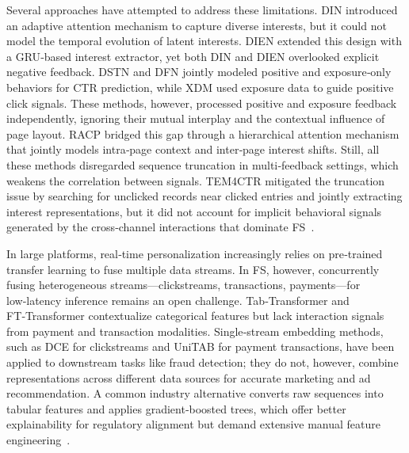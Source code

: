 \documentclass[10pt,twocolumn]{article}
\begin{document}
Several approaches have attempted to address these limitations. 
DIN introduced an adaptive attention mechanism to capture diverse interests, but it could not model the temporal evolution of latent interests. 
DIEN extended this design with a GRU‑based interest extractor, yet both DIN and DIEN overlooked explicit negative feedback. 
DSTN and DFN jointly modeled positive and exposure‑only behaviors for CTR prediction, while XDM used exposure data to guide positive click signals. 
These methods, however, processed positive and exposure feedback independently, ignoring their mutual interplay and the contextual influence of page layout. 
RACP bridged this gap through a hierarchical attention mechanism that jointly models intra‑page context and inter‑page interest shifts. 
Still, all these methods disregarded sequence truncation in multi‑feedback settings, which weakens the correlation between signals. 
TEM4CTR mitigated the truncation issue by searching for unclicked records near clicked entries and jointly extracting interest representations, but it did not account for implicit behavioral signals generated by the cross‑channel interactions that dominate FS~\cite{arxiv-2511.14865,arxiv-2512.04099,arxiv-2511.02877}.

In large platforms, real‑time personalization increasingly relies on pre‑trained transfer learning to fuse multiple data streams. 
In FS, however, concurrently fusing heterogeneous streams—clickstreams, transactions, payments—for low‑latency inference remains an open challenge. 
Tab‑Transformer and FT‑Transformer contextualize categorical features but lack interaction signals from payment and transaction modalities. 
Single‑stream embedding methods, such as DCE for clickstreams and UniTAB for payment transactions, have been applied to downstream tasks like fraud detection; they do not, however, combine representations across different data sources for accurate marketing and ad recommendation. 
A common industry alternative converts raw sequences into tabular features and applies gradient‑boosted trees, which offer better explainability for regulatory alignment but demand extensive manual feature engineering~\cite{arxiv-2511.10879,arxiv-2511.20395,arxiv-2511.17655,arxiv-2510.18636}.
\end{document}
